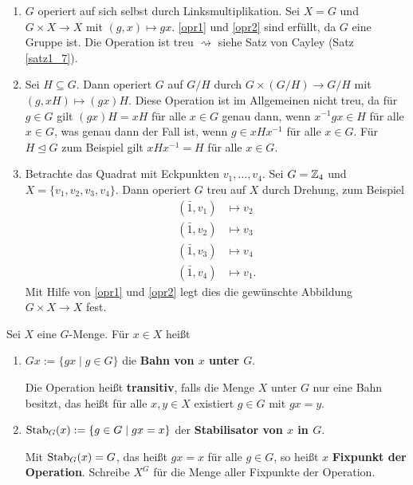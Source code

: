 \begin{beispiel}\label{beispiel3_3}
	\begin{enumerate}[label=(\arabic*)]
		\item $G$ operiert auf sich selbst durch Linksmultiplikation. Sei $X = G$ und $G \times X \to X$ mit $(g,x) \mapsto gx$. \ref{opr1} und \ref{opr2} sind erfüllt, da $G$ eine Gruppe ist. Die Operation ist treu $\rightsquigarrow$ siehe Satz von Cayley (Satz \ref{satz1_7}).
		
		\item Sei $H \subseteq G$. Dann operiert $G$ auf $G/H$ durch $G \times (G/H) \to G/H$ mit $(g,xH) \mapsto (gx)H$. Diese Operation ist im Allgemeinen nicht treu, da für $g \in G$ gilt $(gx)H = xH$ für alle $x \in G$ genau dann, wenn $x^{-1} g x \in H$ für alle $x \in G$, was genau dann der Fall ist, wenn $g \in x H x^{-1}$ für alle $x \in G$. Für $H \unlhd G$ zum Beispiel gilt $xHx^{-1} = H$ für alle $x \in G$.
		
		\item Betrachte das Quadrat mit Eckpunkten $v_1, \dots, v_4$. Sei $G = \mathbb{Z}_4$ und $X = \{v_1, v_2, v_3, v_4\}$. Dann operiert $G$ treu auf $X$ durch Drehung, zum Beispiel
		\begin{align*}
			(\bar{1}, v_1) &\mapsto v_2\\
			(\bar{1}, v_2) &\mapsto v_3\\
			(\bar{1}, v_3) &\mapsto v_4\\
			(\bar{1}, v_4) &\mapsto v_1.
		\end{align*}
		Mit Hilfe von \ref{opr1} und \ref{opr2} legt dies die gewünschte Abbildung $G \times X \to X$ fest.
	\end{enumerate}
\end{beispiel}
\begin{definition}
	Sei $X$ eine $G$-Menge. Für $x \in X$ heißt 
	\begin{enumerate}[label=(\alph*)]
		\item $Gx := \{gx \mid g \in G\}$ die \textbf{Bahn von $x$ unter $G$}. 
		
		Die Operation heißt \textbf{transitiv}, falls die Menge $X$ unter $G$ nur eine Bahn besitzt, das heißt für alle $x,y \in X$ existiert $g \in G$ mit $gx = y$.
		\item $\mathrm{Stab}_G(x) := \{g \in G \mid gx = x\}$ der \textbf{Stabilisator von $x$ in $G$}.
		
		Mit $\mathrm{Stab}_G(x) = G$, das heißt $gx = x$ für alle $g \in G$, so heißt $x$ \textbf{Fixpunkt der Operation}. Schreibe $X^G$ für die Menge aller Fixpunkte der Operation.
	\end{enumerate}
\end{definition}
